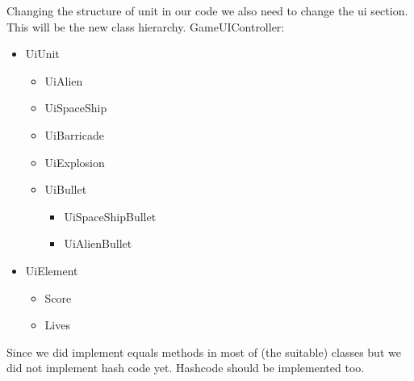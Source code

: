 \documentclass[10pt]{article}
\begin{document}
Changing the structure of unit in our code we also need to change the ui section. This will be the new class hierarchy.	
GameUIController:
\begin{itemize}
	\item UiUnit
	\begin{itemize}
		\item UiAlien
		\item UiSpaceShip
		\item UiBarricade
		\item UiExplosion
		\item UiBullet
		\begin{itemize}
			\item UiSpaceShipBullet
			\item UiAlienBullet
		\end{itemize}
	\end{itemize}
	\item UiElement
	\begin{itemize}
		\item Score
		\item Lives
	\end{itemize}
\end{itemize}
Since we did implement equals methods in most of (the suitable) classes but we did not implement hash code yet. Hashcode should be implemented  too.
\end{document}
